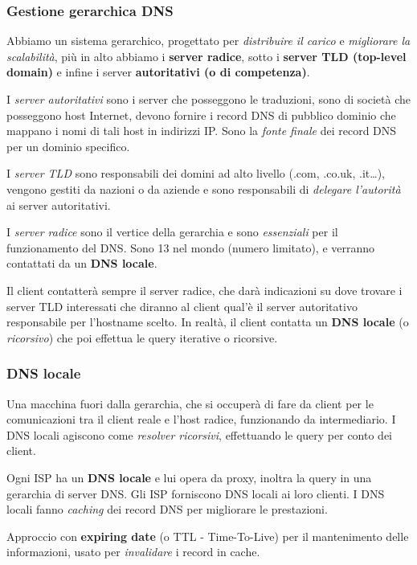 \subsubsection{Gestione gerarchica DNS}
Abbiamo un sistema gerarchico, progettato per \textit{distribuire il carico} e \textit{migliorare la scalabilità}, più in alto abbiamo i \textbf{server radice}, sotto i \textbf{server TLD (top-level domain)} e infine i server \textbf{autoritativi (o di competenza)}.

I \textit{server autoritativi} sono i server che posseggono le traduzioni, sono di società che posseggono host Internet, devono fornire i record DNS di pubblico dominio che mappano i nomi di tali host in indirizzi IP. Sono la \textit{fonte finale} dei record DNS per un dominio specifico.

I \textit{server TLD} sono responsabili dei domini ad alto livello (.com, .co.uk, .it\dots), vengono gestiti da nazioni o da aziende e sono responsabili di \textit{delegare l'autorità} ai server autoritativi.

I \textit{server radice} sono il vertice della gerarchia e sono \textit{essenziali} per il funzionamento del DNS. Sono 13 nel mondo (numero limitato), e verranno contattati da un \textbf{DNS locale}.

Il client contatterà sempre il server radice, che darà indicazioni su dove trovare i server TLD interessati che diranno al client qual'è il server autoritativo responsabile per l'hostname scelto. In realtà, il client contatta un \textbf{DNS locale} (o \textit{ricorsivo}) che poi effettua le query iterative o ricorsive.

\subsubsection{DNS locale}
Una macchina fuori dalla gerarchia, che si occuperà di fare da client per le comunicazioni tra il client reale e l'host radice, funzionando da intermediario. I DNS locali agiscono come \textit{resolver ricorsivi}, effettuando le query per conto dei client.

Ogni ISP ha un \textbf{DNS locale} e lui opera da proxy, inoltra la query in una gerarchia di server DNS. Gli ISP forniscono DNS locali ai loro clienti. I DNS locali fanno \textit{caching} dei record DNS per migliorare le prestazioni.

Approccio con \textbf{expiring date} (o TTL - Time-To-Live) per il mantenimento delle informazioni, usato per \textit{invalidare} i record in cache.

